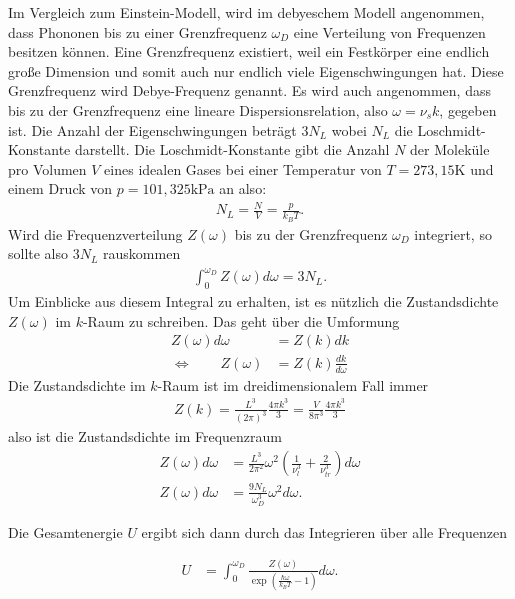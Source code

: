 Im Vergleich zum Einstein-Modell, wird im debyeschem Modell angenommen, dass Phononen bis zu einer Grenzfrequenz $\omega_D$ eine Verteilung von Frequenzen besitzen können. 
Eine Grenzfrequenz existiert, weil ein Festkörper eine endlich große Dimension und somit auch nur endlich viele Eigenschwingungen hat. Diese Grenzfrequenz wird Debye-Frequenz genannt. Es wird auch angenommen, 
dass bis zu der Grenzfrequenz eine lineare Dispersionsrelation, also $\omega = \nu_s k$, gegeben ist. 
Die Anzahl der Eigenschwingungen beträgt $3 N_L$ wobei $N_L$ die Loschmidt-Konstante darstellt. Die Loschmidt-Konstante gibt die Anzahl $N$ der Moleküle pro Volumen $V$ eines idealen Gases 
bei einer Temperatur von $T = 273,15 \si{\kelvin}$ und einem Druck von $p = 101,325 \si{\kilo\pascal}$ an also:
\begin{align}
    N_L = \frac{N}{V} = \frac{p}{k_B T}.
\end{align}
Wird die Frequenzverteilung $Z(\omega)$ bis zu der Grenzfrequenz $\omega_D$ integriert, so sollte also $3 N_L$ rauskommen
\begin{align}
    \label{eqn:Z_integral}
    \int_0^{\omega_D} Z(\omega) d\omega = 3 N_L .
\end{align}
Um Einblicke aus diesem Integral zu erhalten, ist es nützlich die Zustandsdichte $Z(\omega)$ im $k$-Raum zu schreiben. Das geht über die Umformung 
\begin{align}
    Z(\omega) d\omega &= Z(k) d k\\
    \Leftrightarrow \, \, \, \, \, \, \, \, \, \, \, \, Z(\omega) &= Z(k) \frac{d k}{d\omega}
\end{align}
Die Zustandsdichte im $k$-Raum ist im dreidimensionalem Fall immer 
\begin{align}
    Z(k) = \frac{L^3}{\left(2 \pi\right)^3} \frac{4 \pi k^3}{3} = \frac{V}{8 \pi^3} \frac{4 \pi k^3}{3}
\end{align}
also ist die Zustandsdichte im Frequenzraum
\begin{align}
    \label{eqn:Z}
    Z(\omega) d \omega &= \frac{L^3}{2 \pi^2} \omega^2 \left(\frac{1}{\nu^3_l} + \frac{2}{\nu^3_{tr}}\right) d\omega \\
    Z(\omega) d \omega &= \frac{9 N_L}{\omega_D^3} \omega^2 d \omega.
\end{align}

Die Gesamtenergie $U$ ergibt sich dann durch das Integrieren über alle Frequenzen

\begin{align}
    \label{eqn:udebye}
    U &= \int_0^{\omega_D} \frac{Z(\omega)}{\exp \left( \frac{\hbar \omega}{k_B T} - 1 \right)} d\omega.
\end{align}

